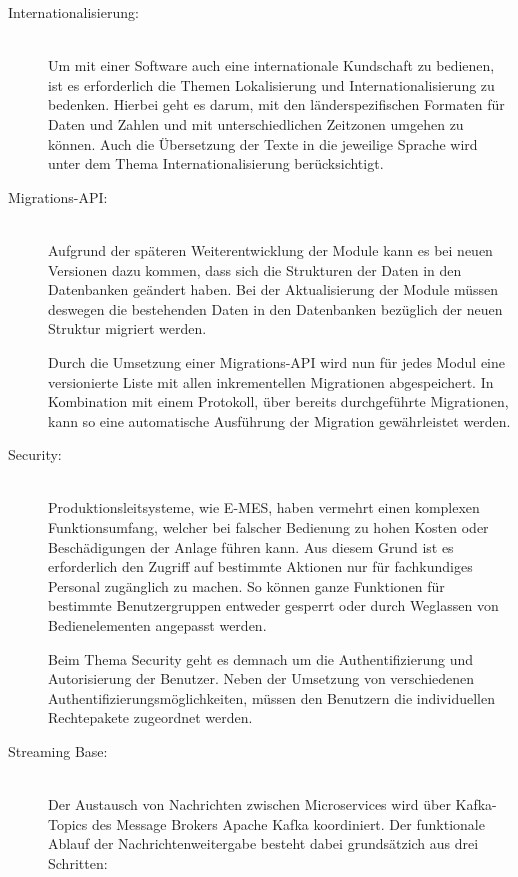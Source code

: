 \begin{description}
    \item[Internationalisierung:]\hfill \\
    Um mit einer Software auch eine internationale Kundschaft zu bedienen, ist es erforderlich die Themen Lokalisierung und Internationalisierung zu bedenken. Hierbei geht es darum, mit den länderspezifischen Formaten für Daten und Zahlen und mit unterschiedlichen Zeitzonen umgehen zu können. Auch die Übersetzung der Texte in die jeweilige Sprache wird unter dem Thema Internationalisierung berücksichtigt.
    
    \item[Migrations-API:]\hfill \\
    Aufgrund der späteren Weiterentwicklung der Module kann es bei neuen Versionen dazu kommen, dass sich die Strukturen der Daten in den Datenbanken geändert haben. Bei der Aktualisierung der Module müssen deswegen die bestehenden Daten in den Datenbanken bezüglich der neuen Struktur migriert werden.

    Durch die Umsetzung einer Migrations-API wird nun für jedes Modul eine versionierte Liste mit allen inkrementellen Migrationen abgespeichert. In Kombination mit einem Protokoll, über bereits durchgeführte Migrationen, kann so eine automatische Ausführung der Migration gewährleistet werden.

    \item[Security:]\hfill \\
    Produktionsleitsysteme, wie \glqq E-MES\grqq{}, haben vermehrt einen komplexen Funktionsumfang, welcher bei falscher Bedienung zu hohen Kosten oder Beschädigungen der Anlage führen kann. Aus diesem Grund ist es erforderlich den Zugriff auf bestimmte Aktionen nur für fachkundiges Personal zugänglich zu machen. So können ganze Funktionen für bestimmte Benutzergruppen entweder gesperrt oder durch Weglassen von Bedienelementen angepasst werden.

    Beim Thema \glqq Security\grqq{} geht es demnach um die Authentifizierung und Autorisierung der Benutzer. Neben der Umsetzung von verschiedenen Authentifizierungsmöglichkeiten, müssen den Benutzern die individuellen Rechtepakete zugeordnet werden.


    \item[Streaming Base:]\hfill \\
    Der Austausch von Nachrichten zwischen Microservices wird über Kafka-Topics des Message Brokers \glqq Apache Kafka\grqq{} koordiniert. Der funktionale Ablauf der Nachrichtenweitergabe besteht dabei grundsätzich aus drei Schritten:


\end{description}
